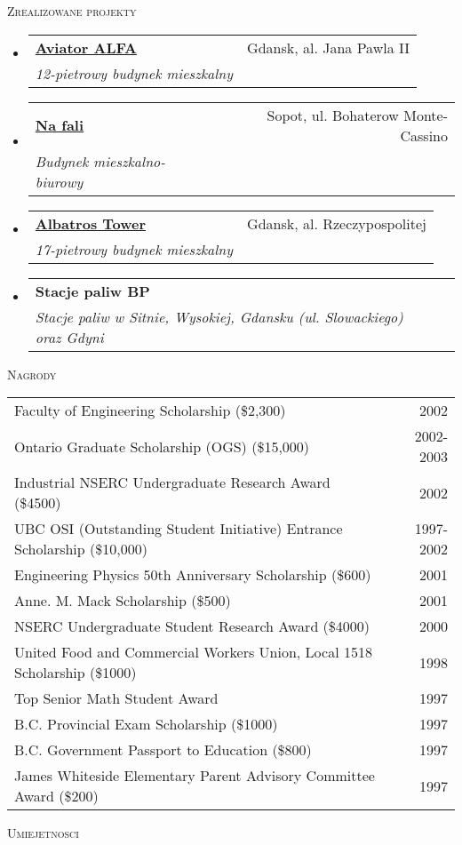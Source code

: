 \documentclass[letterpaper,11pt]{article}
\makeatletter
\newcommand{\resheading}[1]{
  \begin{tcolorbox}
  \textsc{#1}
  \end{tcolorbox}
}
\newcommand{\ressubheading}[4]{
\begin{tabular*}{6.5in}{l@{\extracolsep{\fill}}r}
		\textbf{#1} & #2 \\
		\textit{#3} & \textit{#4} \\
\end{tabular*}\vspace{-6pt}}
\makeatother
\begin{document}
\resheading{Zrealizowane projekty}
\begin{itemize}
\item
  \ressubheading{\href{https://www.allcon.pl/mieszkania/apartamenty/awiator}{Aviator ALFA}}{Gdansk, al. Jana Pawla II}{12-pietrowy budynek mieszkalny}{}

\item
  \ressubheading{\href{https://dom.trojmiasto.pl/Na-Fali-i310.html}{Na fali}}{Sopot, ul. Bohaterow Monte-Cassino}{Budynek mieszkalno-biurowy}{}

\item
  \ressubheading{\href{https://www.gdansk.robyg.pl/oferta/mieszkania/albatross-towers}{Albatros Tower}}{Gdansk, al. Rzeczypospolitej}{17-pietrowy budynek mieszkalny}{}

\item
  \ressubheading{Stacje paliw BP}{}{Stacje paliw w Sitnie, Wysokiej, Gdansku (ul. Slowackiego) oraz Gdyni}{}

\end{itemize}

\resheading{Nagrody}
	\begin{tabular*}{6.5in}{l@{\extracolsep{\fill}}r}
		Faculty of Engineering Scholarship (\$2,300) & 2002\\
		Ontario Graduate Scholarship (OGS) (\$15,000) & 2002-2003\\
		Industrial NSERC Undergraduate Research Award (\$4500) & 2002\\
		UBC OSI (Outstanding Student Initiative) Entrance Scholarship (\$10,000) & 1997-2002\\
		Engineering Physics 50th Anniversary Scholarship (\$600) & 2001\\
		Anne. M. Mack Scholarship (\$500) & 2001\\
		NSERC Undergraduate Student Research Award (\$4000) & 2000\\
		United Food and Commercial Workers Union, Local 1518 Scholarship (\$1000) & 1998\\
		Top Senior Math Student Award & 1997\\
		B.C. Provincial Exam Scholarship (\$1000) & 1997\\
		B.C. Government Passport to Education (\$800) & 1997\\
		James Whiteside Elementary Parent Advisory Committee Award (\$200) & 1997\\
\end{tabular*}

\resheading{Umiejetnosci}
\end{document}
